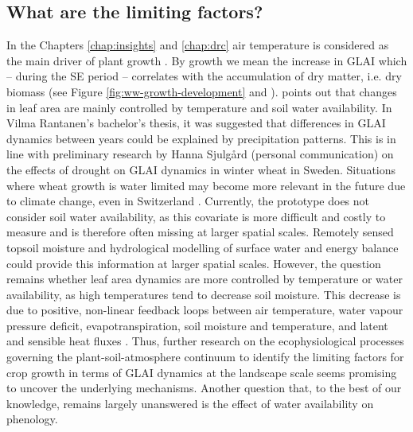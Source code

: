 \subsection{What are the limiting factors?}
In the Chapters \ref{chap:insights} and \ref{chap:drc} air temperature is considered as the main driver of plant growth \citep{porter_temperatures_1999}. By growth we mean the increase in \gls{GLAI} which -- during the \gls{SE} period -- correlates with the accumulation of dry matter, i.e. dry biomass (see Figure \ref{fig:ww-growth-development} and \cite{aase_relationship_1978}). \cite{monteith_climate_1977} points out that changes in leaf area are mainly controlled by temperature and soil water availability. In Vilma Rantanen's bachelor's thesis, it was suggested that differences in \gls{GLAI} dynamics between years could be explained by precipitation patterns. This is in line with preliminary research by Hanna Sjulgård (personal communication) on the effects of drought on \gls{GLAI} dynamics in winter wheat in Sweden. Situations where wheat growth is water limited may become more relevant in the future due to climate change, even in Switzerland \citep{holzkamper_spatial_2015}. Currently, the prototype does not consider soil water availability, as this covariate is more difficult and costly to measure and is therefore often missing at larger spatial scales. Remotely sensed topsoil moisture \citep{lobell_moisture_2002, sadeghi_optical_2017} and hydrological modelling of surface water and energy balance \citep{penman_natural_1948, priestley_assessment_1972, shuttleworth_simplified_1978} could provide this information at larger spatial scales. However, the question remains whether leaf area dynamics are more controlled by temperature or water availability, as high temperatures tend to decrease soil moisture. This decrease is due to positive, non-linear feedback loops between air temperature, water vapour pressure deficit, evapotranspiration, soil moisture and temperature, and latent and sensible heat fluxes \citep{webber_diverging_2018, garcia-garcia_soil_2023}. Thus, further research on the ecophysiological processes governing the plant-soil-atmosphere continuum to identify the limiting factors for crop growth in terms of \gls{GLAI} dynamics at the landscape scale seems promising to uncover the underlying mechanisms. Another question that, to the best of our knowledge, remains largely unanswered is the effect of water availability on phenology.

